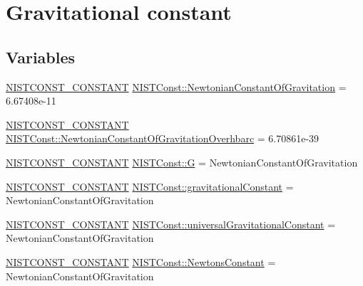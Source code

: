 \hypertarget{group___n_i_s_t_const-_gravitational_constant}{}\section{Gravitational constant}
\label{group___n_i_s_t_const-_gravitational_constant}
\subsection*{Variables}
\begin{DoxyCompactItemize}
\item 
\mbox{\hyperlink{group___n_i_s_t_const-_macros_ga2b0fc1d7452373f816175dd86ce26729}{N\+I\+S\+T\+C\+O\+N\+S\+T\+\_\+\+C\+O\+N\+S\+T\+A\+NT}} \mbox{\hyperlink{group___n_i_s_t_const-_gravitational_constant_gacfed5fae03e441055c1f09406a47f8ce}{N\+I\+S\+T\+Const\+::\+Newtonian\+Constant\+Of\+Gravitation}} = 6.\+67408e-\/11
\item 
\mbox{\hyperlink{group___n_i_s_t_const-_macros_ga2b0fc1d7452373f816175dd86ce26729}{N\+I\+S\+T\+C\+O\+N\+S\+T\+\_\+\+C\+O\+N\+S\+T\+A\+NT}} \mbox{\hyperlink{group___n_i_s_t_const-_gravitational_constant_gaab8e9e8695add729258bef9e2fc7e9bf}{N\+I\+S\+T\+Const\+::\+Newtonian\+Constant\+Of\+Gravitation\+Overhbarc}} = 6.\+70861e-\/39
\item 
\mbox{\hyperlink{group___n_i_s_t_const-_macros_ga2b0fc1d7452373f816175dd86ce26729}{N\+I\+S\+T\+C\+O\+N\+S\+T\+\_\+\+C\+O\+N\+S\+T\+A\+NT}} \mbox{\hyperlink{group___n_i_s_t_const-_gravitational_constant_ga99d2961d6c5c892fb90c8f1b36f5fcd8}{N\+I\+S\+T\+Const\+::G}} = Newtonian\+Constant\+Of\+Gravitation
\item 
\mbox{\hyperlink{group___n_i_s_t_const-_macros_ga2b0fc1d7452373f816175dd86ce26729}{N\+I\+S\+T\+C\+O\+N\+S\+T\+\_\+\+C\+O\+N\+S\+T\+A\+NT}} \mbox{\hyperlink{group___n_i_s_t_const-_gravitational_constant_gae20aa18e6ec2c075d2b5a6af18f30b5f}{N\+I\+S\+T\+Const\+::gravitational\+Constant}} = Newtonian\+Constant\+Of\+Gravitation
\item 
\mbox{\hyperlink{group___n_i_s_t_const-_macros_ga2b0fc1d7452373f816175dd86ce26729}{N\+I\+S\+T\+C\+O\+N\+S\+T\+\_\+\+C\+O\+N\+S\+T\+A\+NT}} \mbox{\hyperlink{group___n_i_s_t_const-_gravitational_constant_gafc4a1b84021bd81d225eead906164721}{N\+I\+S\+T\+Const\+::universal\+Gravitational\+Constant}} = Newtonian\+Constant\+Of\+Gravitation
\item 
\mbox{\hyperlink{group___n_i_s_t_const-_macros_ga2b0fc1d7452373f816175dd86ce26729}{N\+I\+S\+T\+C\+O\+N\+S\+T\+\_\+\+C\+O\+N\+S\+T\+A\+NT}} \mbox{\hyperlink{group___n_i_s_t_const-_gravitational_constant_gae40947c8bfb3aa0da4a156bdfbe8dd34}{N\+I\+S\+T\+Const\+::\+Newtons\+Constant}} = Newtonian\+Constant\+Of\+Gravitation
\end{DoxyCompactItemize}


